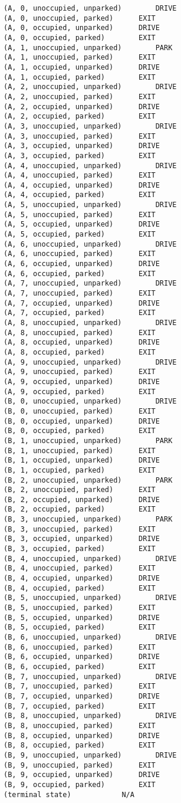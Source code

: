\documentclass[paper=a4, fontsize=11pt]{scrartcl}
\begin{document}
\begin{verbatim}
(A, 0, unoccupied, unparked)		DRIVE
(A, 0, unoccupied, parked)		EXIT
(A, 0, occupied, unparked)		DRIVE
(A, 0, occupied, parked)		EXIT
(A, 1, unoccupied, unparked)		PARK
(A, 1, unoccupied, parked)		EXIT
(A, 1, occupied, unparked)		DRIVE
(A, 1, occupied, parked)		EXIT
(A, 2, unoccupied, unparked)		DRIVE
(A, 2, unoccupied, parked)		EXIT
(A, 2, occupied, unparked)		DRIVE
(A, 2, occupied, parked)		EXIT
(A, 3, unoccupied, unparked)		DRIVE
(A, 3, unoccupied, parked)		EXIT
(A, 3, occupied, unparked)		DRIVE
(A, 3, occupied, parked)		EXIT
(A, 4, unoccupied, unparked)		DRIVE
(A, 4, unoccupied, parked)		EXIT
(A, 4, occupied, unparked)		DRIVE
(A, 4, occupied, parked)		EXIT
(A, 5, unoccupied, unparked)		DRIVE
(A, 5, unoccupied, parked)		EXIT
(A, 5, occupied, unparked)		DRIVE
(A, 5, occupied, parked)		EXIT
(A, 6, unoccupied, unparked)		DRIVE
(A, 6, unoccupied, parked)		EXIT
(A, 6, occupied, unparked)		DRIVE
(A, 6, occupied, parked)		EXIT
(A, 7, unoccupied, unparked)		DRIVE
(A, 7, unoccupied, parked)		EXIT
(A, 7, occupied, unparked)		DRIVE
(A, 7, occupied, parked)		EXIT
(A, 8, unoccupied, unparked)		DRIVE
(A, 8, unoccupied, parked)		EXIT
(A, 8, occupied, unparked)		DRIVE
(A, 8, occupied, parked)		EXIT
(A, 9, unoccupied, unparked)		DRIVE
(A, 9, unoccupied, parked)		EXIT
(A, 9, occupied, unparked)		DRIVE
(A, 9, occupied, parked)		EXIT
(B, 0, unoccupied, unparked)		DRIVE
(B, 0, unoccupied, parked)		EXIT
(B, 0, occupied, unparked)		DRIVE
(B, 0, occupied, parked)		EXIT
(B, 1, unoccupied, unparked)		PARK
(B, 1, unoccupied, parked)		EXIT
(B, 1, occupied, unparked)		DRIVE
(B, 1, occupied, parked)		EXIT
(B, 2, unoccupied, unparked)		PARK
(B, 2, unoccupied, parked)		EXIT
(B, 2, occupied, unparked)		DRIVE
(B, 2, occupied, parked)		EXIT
(B, 3, unoccupied, unparked)		PARK
(B, 3, unoccupied, parked)		EXIT
(B, 3, occupied, unparked)		DRIVE
(B, 3, occupied, parked)		EXIT
(B, 4, unoccupied, unparked)		DRIVE
(B, 4, unoccupied, parked)		EXIT
(B, 4, occupied, unparked)		DRIVE
(B, 4, occupied, parked)		EXIT
(B, 5, unoccupied, unparked)		DRIVE
(B, 5, unoccupied, parked)		EXIT
(B, 5, occupied, unparked)		DRIVE
(B, 5, occupied, parked)		EXIT
(B, 6, unoccupied, unparked)		DRIVE
(B, 6, unoccupied, parked)		EXIT
(B, 6, occupied, unparked)		DRIVE
(B, 6, occupied, parked)		EXIT
(B, 7, unoccupied, unparked)		DRIVE
(B, 7, unoccupied, parked)		EXIT
(B, 7, occupied, unparked)		DRIVE
(B, 7, occupied, parked)		EXIT
(B, 8, unoccupied, unparked)		DRIVE
(B, 8, unoccupied, parked)		EXIT
(B, 8, occupied, unparked)		DRIVE
(B, 8, occupied, parked)		EXIT
(B, 9, unoccupied, unparked)		DRIVE
(B, 9, unoccupied, parked)		EXIT
(B, 9, occupied, unparked)		DRIVE
(B, 9, occupied, parked)		EXIT
(terminal state)			N/A
\end{verbatim}
\end{document}

